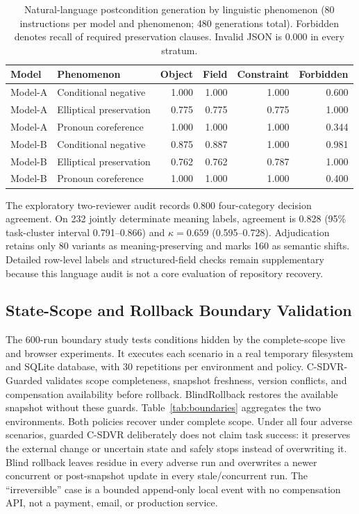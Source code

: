 \documentclass[pdflatex,sn-apa]{sn-jnl}
\begin{document}
\begin{table}[htbp]
\centering
\caption{Natural-language postcondition generation by linguistic phenomenon (80 instructions per model and phenomenon; 480 generations total). Forbidden denotes recall of required preservation clauses. Invalid JSON is 0.000 in every stratum.}
\label{tab:pcnatural}
\scriptsize
\setlength{\tabcolsep}{4.0pt}
\begin{tabular}{llrrrr}
\toprule
Model & Phenomenon & Object & Field & Constraint & Forbidden \\
\midrule
Model-A & Conditional negative & 1.000 & 1.000 & 1.000 & 0.600 \\
Model-A & Elliptical preservation & 0.775 & 0.775 & 0.775 & 1.000 \\
Model-A & Pronoun coreference & 1.000 & 1.000 & 1.000 & 0.344 \\
Model-B & Conditional negative & 0.875 & 0.887 & 1.000 & 0.981 \\
Model-B & Elliptical preservation & 0.762 & 0.762 & 0.787 & 1.000 \\
Model-B & Pronoun coreference & 1.000 & 1.000 & 1.000 & 0.400 \\
\bottomrule
\end{tabular}
\end{table}

The exploratory two-reviewer audit records 0.800 four-category decision agreement. On 232 jointly determinate meaning labels, agreement is 0.828 (95\% task-cluster interval 0.791--0.866) and $\kappa=0.659$ (0.595--0.728). Adjudication retains only 80 variants as meaning-preserving and marks 160 as semantic shifts. Detailed row-level labels and structured-field checks remain supplementary because this language audit is not a core evaluation of repository recovery.

\subsection{State-Scope and Rollback Boundary Validation}

The 600-run boundary study tests conditions hidden by the complete-scope live and browser experiments. It executes each scenario in a real temporary filesystem and SQLite database, with 30 repetitions per environment and policy. C-SDVR-Guarded validates scope completeness, snapshot freshness, version conflicts, and compensation availability before rollback. BlindRollback restores the available snapshot without these guards. Table~\ref{tab:boundaries} aggregates the two environments. Both policies recover under complete scope. Under all four adverse scenarios, guarded C-SDVR deliberately does not claim task success: it preserves the external change or uncertain state and safely stops instead of overwriting it. Blind rollback leaves residue in every adverse run and overwrites a newer concurrent or post-snapshot update in every stale/concurrent run. The ``irreversible'' case is a bounded append-only local event with no compensation API, not a payment, email, or production service.
\end{document}

